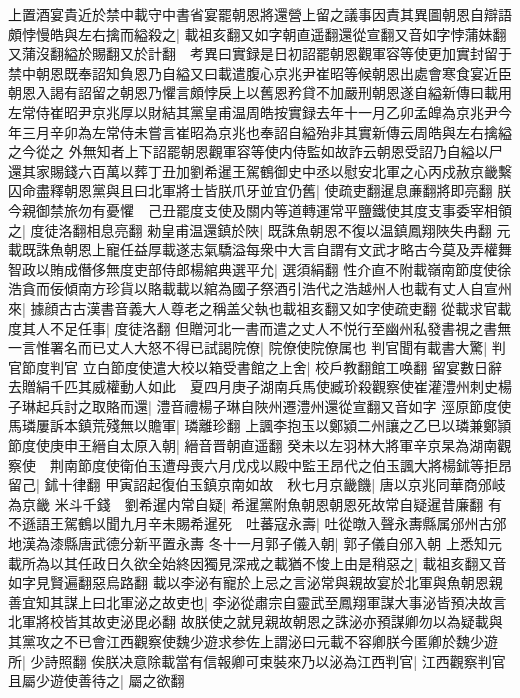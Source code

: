 上置酒宴貴近於禁中載守中書省宴罷朝恩將還營上留之議事因責其異圖朝恩自辯語頗悖慢皓與左右擒而縊殺之|{
	載祖亥翻又如字朝直遥翻還從宣翻又音如字悖蒲妹翻又蒲沒翻縊於賜翻又於計翻　考異曰實録是日初詔罷朝恩觀軍容等使更加實封留于禁中朝恩既奉詔知負恩乃自縊又曰載遣腹心京兆尹崔昭等候朝恩出處會寒食宴近臣朝恩入謁有詔留之朝恩乃懼言頗悖戾上以舊恩矜貸不加嚴刑朝恩遂自縊新傳曰載用左常侍崔昭尹京兆厚以財結其黨皇甫温周皓按實録去年十一月乙卯孟皥為京兆尹今年三月辛卯為左常侍未嘗言崔昭為京兆也奉詔自縊殆非其實新傳云周皓與左右擒縊之今從之}
外無知者上下詔罷朝恩觀軍容等使内侍監如故詐云朝恩受詔乃自縊以尸還其家賜錢六百萬以葬丁丑加劉希暹王駕鶴御史中丞以慰安北軍之心丙戍赦京畿繫囚命盡釋朝恩黨與且曰北軍將士皆朕爪牙並宜仍舊|{
	使疏吏翻暹息亷翻將即亮翻}
朕今親御禁旅勿有憂懼　己丑罷度支使及關内等道轉運常平鹽鐵使其度支事委宰相領之|{
	度徒洛翻相息亮翻}
勑皇甫温還鎮於陜|{
	既誅魚朝恩不復以温鎮鳳翔陜失冉翻}
元載既誅魚朝恩上寵任益厚載遂志氣驕溢每衆中大言自謂有文武才略古今莫及弄權舞智政以賄成僭侈無度吏部侍郎楊綰典選平允|{
	選須絹翻}
性介直不附載嶺南節度使徐浩貪而佞傾南方珍貨以賂載載以綰為國子祭酒引浩代之浩越州人也載有丈人自宣州來|{
	據顔古古漢書音義大人尊老之稱盖父執也載祖亥翻又如字使疏吏翻}
從載求官載度其人不足任事|{
	度徒洛翻}
但贈河北一書而遣之丈人不悦行至幽州私發書視之書無一言惟署名而已丈人大怒不得已試謁院僚|{
	院僚使院僚属也}
判官聞有載書大驚|{
	判官節度判官}
立白節度使遣大校以箱受書館之上舍|{
	校戶教翻館工唤翻}
留宴數日辭去贈絹千匹其威權動人如此　夏四月庚子湖南兵馬使臧玠殺觀察使崔灌澧州刺史楊子琳起兵討之取賂而還|{
	澧音禮楊子琳自陜州遷澧州還從宣翻又音如字}
涇原節度使馬璘屢訴本鎮荒殘無以贍軍|{
	璘離珍翻}
上諷李抱玉以鄭潁二州讓之乙巳以璘兼鄭頴節度使庚申王縉自太原入朝|{
	縉音晋朝直遥翻}
癸未以左羽林大將軍辛京杲為湖南觀察使　荆南節度使衛伯玉遭母喪六月戊戍以殿中監王昂代之伯玉諷大將楊鉥等拒昂留己|{
	鉥十律翻}
甲寅詔起復伯玉鎮京南如故　秋七月京畿饑|{
	唐以京兆同華商邠岐為京畿}
米斗千錢　劉希暹内常自疑|{
	希暹黨附魚朝恩朝恩死故常自疑暹昔廉翻}
有不遜語王駕鶴以聞九月辛未賜希暹死　吐蕃寇永壽|{
	吐從暾入聲永夀縣属邠州古邠地漢為漆縣唐武德分新平置永夀}
冬十一月郭子儀入朝|{
	郭子儀自邠入朝}
上悉知元載所為以其任政日久欲全始終因獨見深戒之載猶不悛上由是稍惡之|{
	載祖亥翻又音如字見賢遍翻惡烏路翻}
載以李泌有寵於上忌之言泌常與親故宴於北軍與魚朝恩親善宜知其謀上曰北軍泌之故吏也|{
	李泌從肅宗自靈武至鳳翔軍謀大事泌皆預决故言北軍將校皆其故吏泌毘必翻}
故朕使之就見親故朝恩之誅泌亦預謀卿勿以為疑載與其黨攻之不已會江西觀察使魏少遊求参佐上謂泌曰元載不容卿朕今匿卿於魏少遊所|{
	少詩照翻}
俟朕决意除載當有信報卿可束裝來乃以泌為江西判官|{
	江西觀察判官}
且屬少遊使善待之|{
	屬之欲翻}


